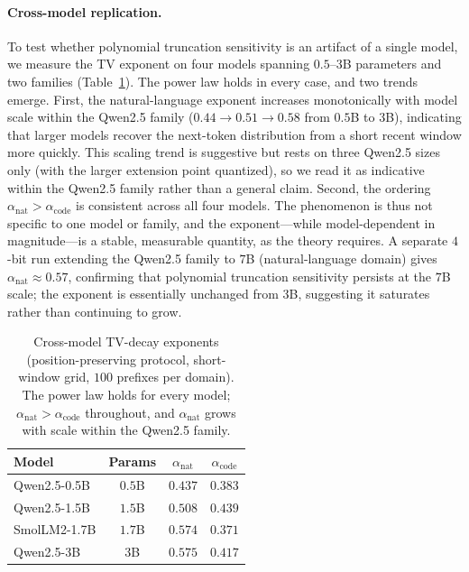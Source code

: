 \documentclass[11pt]{article}
\theoremstyle{plain}
\theoremstyle{definition}
\theoremstyle{remark}
\begin{document}
\paragraph{Cross-model replication.}
\label{sec:exp-crossmodel}
To test whether polynomial truncation sensitivity is an artifact of
a single model, we measure the TV exponent on four models spanning
$0.5$--$3$B parameters and two families
(Table~\ref{tab:crossmodel}). The power law holds in every case, and
two trends emerge. First, the natural-language exponent increases
monotonically with model scale within the Qwen2.5 family
($0.44 \to 0.51 \to 0.58$ from $0.5$B to $3$B), indicating that
larger models recover the next-token distribution from a short
recent window more quickly. This scaling trend is suggestive but
rests on three Qwen2.5 sizes only (with the larger extension point
quantized), so we read it as indicative within the Qwen2.5 family
rather than a general claim.
Second, the ordering $\alpha_{\text{nat}} > \alpha_{\text{code}}$ is
consistent across all four models. The phenomenon is thus not
specific to one model or family, and the exponent---while
model-dependent in magnitude---is a stable, measurable quantity, as
the theory requires. A separate $4$-bit run extending the Qwen2.5
family to $7$B (natural-language domain) gives
$\alpha_{\text{nat}} \approx 0.57$, confirming that polynomial
truncation sensitivity persists at the $7$B scale; the exponent is
essentially unchanged from $3$B, suggesting it saturates rather than
continuing to grow.

\begin{table}[t]
\centering
\small
\setlength{\tabcolsep}{6pt}
\begin{tabular}{lccc}
\toprule
Model & Params & $\alpha_{\text{nat}}$ & $\alpha_{\text{code}}$ \\
\midrule
Qwen2.5-0.5B   & $0.5$B & $0.437$ & $0.383$ \\
Qwen2.5-1.5B   & $1.5$B & $0.508$ & $0.439$ \\
SmolLM2-1.7B   & $1.7$B & $0.574$ & $0.371$ \\
Qwen2.5-3B     & $3$B   & $0.575$ & $0.417$ \\
\bottomrule
\end{tabular}
\caption{Cross-model TV-decay exponents (position-preserving
protocol, short-window grid, $100$ prefixes per domain). The power
law holds for every model; $\alpha_{\text{nat}} > \alpha_{\text{code}}$
throughout, and $\alpha_{\text{nat}}$ grows with scale within the
Qwen2.5 family.}
\label{tab:crossmodel}
\end{table}
\end{document}
